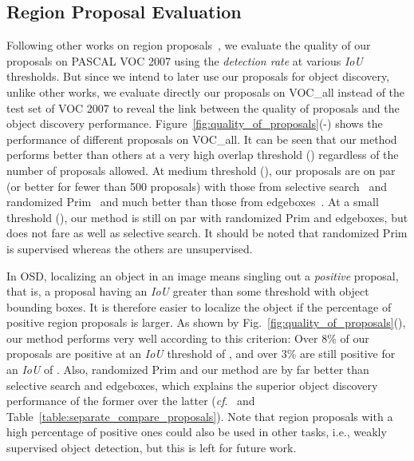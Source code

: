 \documentclass[runningheads]{llncs}
\begin{document}
\subsection{Region Proposal Evaluation}
Following other works on region proposals~\cite{Manen2013prim,uijlings2013selective,zitnick2014edge}, we evaluate the quality of our proposals on PASCAL VOC 2007 using the \textit{detection rate} at various \textit{IoU} thresholds. But since we intend to later use our proposals for object discovery, unlike other works, we evaluate directly our proposals on VOC\_all instead of the test set of VOC 2007 to reveal the link between the quality of proposals and the object discovery performance. Figure~\ref{fig:quality_of_proposals}(\protect{}-\protect{}) shows the performance of different proposals on VOC\_all. It can be seen that our method performs better than others at a very high overlap threshold () regardless of the number of proposals allowed. At medium threshold (), our proposals are on par (or better for fewer than 500 proposals) with those from selective search~\cite{uijlings2013selective} and randomized Prim~\cite{Manen2013prim} and much better than those from edgeboxes~\cite{zitnick2014edge}. At a small threshold (), our method is still on par with randomized Prim and edgeboxes, but does not fare as well as selective search. It should be noted that randomized Prim is supervised whereas the others are unsupervised.

In OSD, localizing an object in an image means singling out a 
{\em positive} proposal, that is, a proposal having an \textit{IoU} greater than some threshold with object bounding boxes. It is therefore easier to localize the object if the percentage of positive region proposals is larger. As shown by Fig.~\ref{fig:quality_of_proposals}(\protect{}), our method performs very well according to this criterion: Over 8\% of our proposals are positive at an \textit{IoU} threshold of , and over 3\% are still positive for an \textit{IoU} of . Also, randomized Prim and our method are by far better than selective search and edgeboxes, which explains the superior object discovery performance of the former over the latter (\textit{cf}.~\cite{Vo2019UnsupOptim} and Table~\ref{table:separate_compare_proposals}). Note that region proposals with a high percentage of positive ones could also be used in other tasks, i.e., weakly supervised object detection, but this is left for future work.
\end{document}
